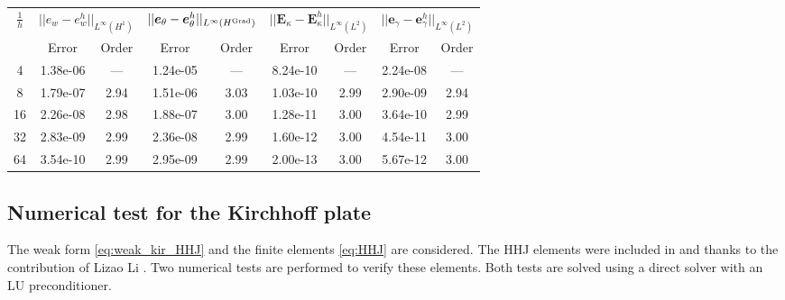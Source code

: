 \begin{table}[hp]
	\centering
	\begin{tabular}{ccccccccc}
		\hline 
		\multirow{2}{*}{$\frac{1}{h}$} & \multicolumn{2}{c}{$||e_w - e_w^h||_{L^{\infty}(H^1)}$}    & \multicolumn{2}{c}{$||\bm{e}_\theta - \bm{e}_\theta^h||_{L^{\infty}(H^{\operatorname*{Grad}})}$} & \multicolumn{2}{c}{$||\bm{E}_\kappa - \bm{E}_\kappa^h||_{L^{\infty}(L^2)}$} & \multicolumn{2}{c}{$||\bm{e}_\gamma - \bm{e}_\gamma^ h||_{L^{\infty}(L^2)}$}   \\
		& Error & Order  & Error & Order  & Error & Order  & Error & Order   \\ 
		\hline 
		4  & 1.38e-06 & ---  & 1.24e-05 & ---  & 8.24e-10 & ---  & 2.24e-08 & --- \\ 
		8  & 1.79e-07 & 2.94 & 1.51e-06 & 3.03 & 1.03e-10 & 2.99 & 2.90e-09 & 2.94\\ 
		16 & 2.26e-08 & 2.98 & 1.88e-07 & 3.00 & 1.28e-11 & 3.00 & 3.64e-10 & 2.99\\ 
		32 & 2.83e-09 & 2.99 & 2.36e-08 & 2.99 & 1.60e-12 & 3.00 & 4.54e-11 & 3.00\\ 
		64 & 3.54e-10 & 2.99 & 2.95e-09 & 2.99 & 2.00e-13 & 3.00 & 5.67e-12 & 3.00\\ 
		\hline 
	\end{tabular} 
	\captionsetup{width=0.95\linewidth}
	\vspace{1mm}
	\label{tab:resminCGDG_k3}
\end{table}


\subsection{Numerical test for the Kirchhoff plate}
The weak form \eqref{eq:weak_kir_HHJ} and the finite elements \eqref{eq:HHJ} are considered. The HHJ elements were included in {} and {} thanks to the contribution of Lizao Li \cite{li2018regge}. Two numerical tests are performed to verify these elements. Both tests are solved using a direct solver with an LU preconditioner. \\ 

